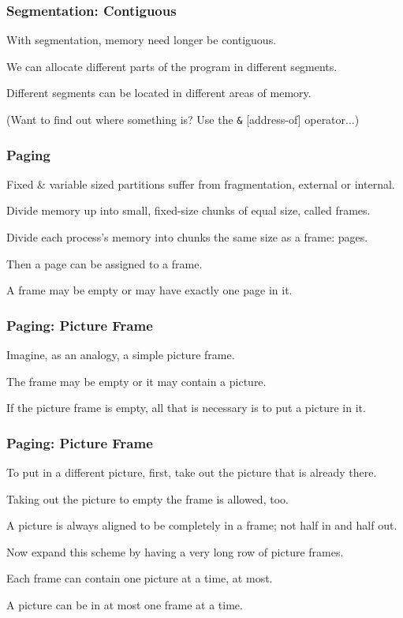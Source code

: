 \begin{frame}
\frametitle{Segmentation: Contiguous}

With segmentation, memory need longer be contiguous. 

We can allocate different parts of the program in different segments. 

Different segments can be located in different areas of memory.

(Want to find out where something is? Use the \texttt{\&} [address-of] operator...)


\end{frame}

\begin{frame}
\frametitle{Paging}

Fixed \& variable sized partitions suffer from fragmentation, external or internal. 

Divide memory up into small, fixed-size chunks of equal size, called \alert{frames}. 

Divide each process's memory into chunks the same size as a frame: \alert{pages}. 

Then a page can be assigned to a frame. 

A frame may be empty or may have exactly one page in it. 


\end{frame}

\begin{frame}
\frametitle{Paging: Picture Frame}

Imagine, as an analogy, a simple picture frame. 

The frame may be empty or it may contain a picture. 

If the picture frame is empty, all that is necessary is to put a picture in it. 


\end{frame}

\begin{frame}
\frametitle{Paging: Picture Frame}

To put in a different picture, first, take out the picture that is already there. 

Taking out the picture to empty the frame is allowed, too. 

A picture is always aligned to be completely in a frame; not half in and half out. 

Now expand this scheme by having a very long row of picture frames. 

Each frame can contain one picture at a time, at most. 

A picture can be in at most one frame at a time. 

\end{frame}

